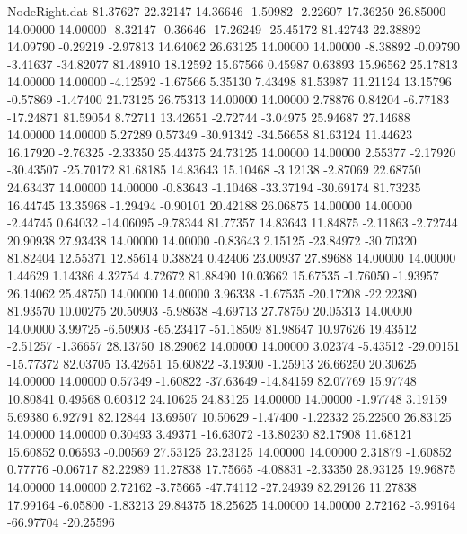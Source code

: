 \begin{filecontents}{NodeRight.dat}
  81.37627   22.32147   14.36646    -1.50982   -2.22607   17.36250   26.85000   14.00000   14.00000   -8.32147   -0.36646  -17.26249  -25.45172
  81.42743   22.38892   14.09790    -0.29219   -2.97813   14.64062   26.63125   14.00000   14.00000   -8.38892   -0.09790   -3.41637  -34.82077
  81.48910   18.12592   15.67566     0.45987    0.63893   15.96562   25.17813   14.00000   14.00000   -4.12592   -1.67566    5.35130    7.43498
  81.53987   11.21124   13.15796    -0.57869   -1.47400   21.73125   26.75313   14.00000   14.00000    2.78876    0.84204   -6.77183  -17.24871
  81.59054    8.72711   13.42651    -2.72744   -3.04975   25.94687   27.14688   14.00000   14.00000    5.27289    0.57349  -30.91342  -34.56658
  81.63124   11.44623   16.17920    -2.76325   -2.33350   25.44375   24.73125   14.00000   14.00000    2.55377   -2.17920  -30.43507  -25.70172
  81.68185   14.83643   15.10468    -3.12138   -2.87069   22.68750   24.63437   14.00000   14.00000   -0.83643   -1.10468  -33.37194  -30.69174
  81.73235   16.44745   13.35968    -1.29494   -0.90101   20.42188   26.06875   14.00000   14.00000   -2.44745    0.64032  -14.06095   -9.78344
  81.77357   14.83643   11.84875    -2.11863   -2.72744   20.90938   27.93438   14.00000   14.00000   -0.83643    2.15125  -23.84972  -30.70320
  81.82404   12.55371   12.85614     0.38824    0.42406   23.00937   27.89688   14.00000   14.00000    1.44629    1.14386    4.32754    4.72672
  81.88490   10.03662   15.67535    -1.76050   -1.93957   26.14062   25.48750   14.00000   14.00000    3.96338   -1.67535  -20.17208  -22.22380
  81.93570   10.00275   20.50903    -5.98638   -4.69713   27.78750   20.05313   14.00000   14.00000    3.99725   -6.50903  -65.23417  -51.18509
  81.98647   10.97626   19.43512    -2.51257   -1.36657   28.13750   18.29062   14.00000   14.00000    3.02374   -5.43512  -29.00151  -15.77372
  82.03705   13.42651   15.60822    -3.19300   -1.25913   26.66250   20.30625   14.00000   14.00000    0.57349   -1.60822  -37.63649  -14.84159
  82.07769   15.97748   10.80841     0.49568    0.60312   24.10625   24.83125   14.00000   14.00000   -1.97748    3.19159    5.69380    6.92791
  82.12844   13.69507   10.50629    -1.47400   -1.22332   25.22500   26.83125   14.00000   14.00000    0.30493    3.49371  -16.63072  -13.80230
  82.17908   11.68121   15.60852     0.06593   -0.00569   27.53125   23.23125   14.00000   14.00000    2.31879   -1.60852    0.77776   -0.06717
  82.22989   11.27838   17.75665    -4.08831   -2.33350   28.93125   19.96875   14.00000   14.00000    2.72162   -3.75665  -47.74112  -27.24939
  82.29126   11.27838   17.99164    -6.05800   -1.83213   29.84375   18.25625   14.00000   14.00000    2.72162   -3.99164  -66.97704  -20.25596

\end{filecontents}
